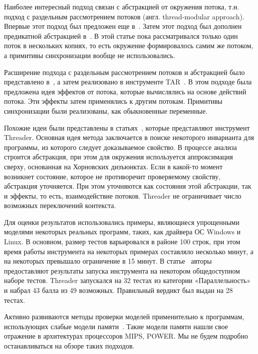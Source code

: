 Наиболее интересный подход связан с абстракцией от окружения потока, т.н. подход с раздельным рассмотрением потоков (англ. thread-modular approach). 
Впервые этот подход был предложен еще в~\cite{ThreadModular03}.
Затем этот подход был дополнен предикатной абстракцией в~\cite{Henzinger:2004}.
В этой статье пока рассматривался только один поток в нескольких копиях, то есть окружение формировалось самим же потоком, а примитивы синхронизации вообще не использовались.

Расширение подхода с раздельным рассмотрением потоков и абстракцией было представлено в~\cite{Malkis:2006}, а затем реализовано в инструменте TAR~\cite{TAR}.
В этом подходе была предложена идея эффектов от потока, которые вычислялись на основе действий потока. Эти эффекты затем применялись к другим потокам.
Примитивы синхронизации были реализованы, как обыкновенные переменные.

Похожие идеи были представлены в статьях~\cite{Threader:2011,Gupta:2011:POPL,Gupta:2011}, которые представляют инструмент Threader.
Основная идея метода заключается в поиске некоторого инварианта для программы, из которого следует доказываемое свойство.
В процессе анализа строится абстракция, при этом для окружения используется аппроксимация сверху, основанная на Хорновских дизъюнктах.
Если в какой-то момент возникнет состояние, которое не противоречит проверяемому свойству, абстракция уточняется.
При этом уточняются как состояния этой абстракции, так и эффекты, то есть, взаимодействие потоков.
Threader не ограничивает число возможных переключений контекста.

Для оценки результатов использовались примеры, являющиеся упрощенными моделями некоторых реальных программ, таких, как драйвера ОС Windows и Linux.
В основном, размер тестов варьировался в районе 100 строк, при этом время работы инструмента на некоторых примерах составляло несколько минут, а на некоторых превышало ограничение в 15 минут. 
В статье~\cite{Threader:svcomp} авторы предоставляют результаты запуска инструмента на некотором общедоступном наборе тестов.
Threader запускался на 32 тестах из категории «Параллельность» и набрал 43 балла из 49 возможных. Правильный вердикт был выдан на 28 тестах.

Активно развиваются методы проверки моделей применительно к программам, использующих слабые модели памяти~\cite{Alglave:2013,Zhang:2015,Abdulla:2017}. 
Такие модели памяти нашли свое отражение в архитектурах процессоров MIPS, POWER.
Мы не будем подробно останавливаться на обзоре таких подходов.

